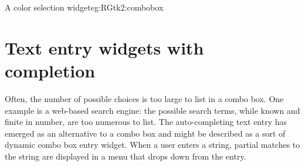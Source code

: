 \begin{example}{A color selection widget}{eg:RGtk2:combobox}










\end{example}


\section{Text entry widgets with completion}
\label{sec:RGtk2:entry-completion}

Often, the number of possible choices is too large to list in a combo
box. One example is a web-based search engine: the possible search
terms, while known and finite in number, are too numerous to list. The
auto-completing text entry has emerged as an alternative to a combo
box and might be described as a sort of dynamic combo box entry widget. 
When a user enters a string, partial matches to the string are
displayed in a menu that drops down from the entry. 

